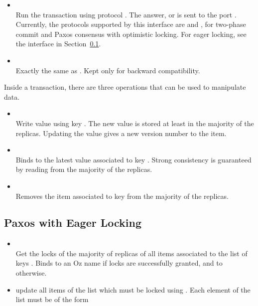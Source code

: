 \documentclass[11pt]{article}
\begin{document}
\begin{itemize}

\item {}\\ Run the transaction
 using protocol . The answer,  or
 is sent to the port . Currently, the protocols
supported by this interface are  and , for
two-phase commit and Paxos consensus with optimistic locking. For eager
locking, see the interface in Section~\ref{apx:beernet:eager-locking}.

\item {}\\ Exactly the same as
. Kept only for backward compatibility.

\end{itemize}

Inside a transaction, there are three operations that can be used to
manipulate data.

\begin{itemize}

\item {}\\ Write value  using key . The
new value is stored at least in the majority of the replicas. Updating the
value gives a new version number to the item.

\item {}\\ Binds  to the latest value associated
to key . Strong consistency is guaranteed by reading from the
majority of the replicas. 

\item {}\\ Removes the item associated to key  from
the majority of the replicas.

\end{itemize}

\subsection{Paxos with Eager Locking}
\label{apx:beernet:eager-locking}

\begin{itemize}

\item {}\\ Get the locks of the majority of
replicas of all items associated to the list of keys . Binds
 to an Oz name if locks are successfully granted, and to
 otherwise.

\item {} update all items of the
list  which must be locked using . Each
element of the list  must be of the form

\end{itemize}
\end{document}
